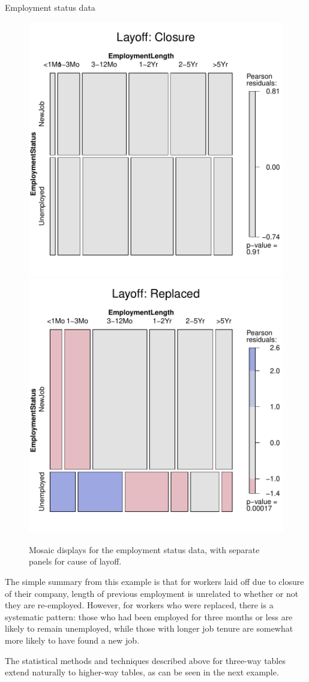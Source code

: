 \documentclass[11pt]{book}\usepackage[]{graphicx}\usepackage[]{color}
\newenvironment{knitrout}{}{} %
\renewenvironment{knitrout}{\small\renewcommand{\baselinestretch}{.85}}{} %
\begin{document}
\begin{Example}[employ]{Employment status data}
\begin{knitrout}
\begin{figure}[htbp]
\centerline{\includegraphics[width=.49\textwidth]{ch05/fig/employ-mos31} 
\includegraphics[width=.49\textwidth]{ch05/fig/employ-mos32} }

\caption[Mosaic displays for the employment status data, with separate panels for cause of layoff]{Mosaic displays for the employment status data, with separate panels for cause of layoff.\label{fig:employ-mos3}}
\end{figure}


\end{knitrout}

The simple summary from this example is that for workers laid off due to closure of
their company, length of previous employment is unrelated to whether or not they 
are re-employed.  However, for workers who were replaced,
there is a systematic pattern:
those who had been employed for three months or less
are likely to remain unemployed, while those
with longer job tenure are somewhat more likely to have found a new job.
\end{Example}

The statistical methods and \R techniques described above for three-way tables
extend naturally to higher-way tables, as can be seen in the next example.
\end{document}
